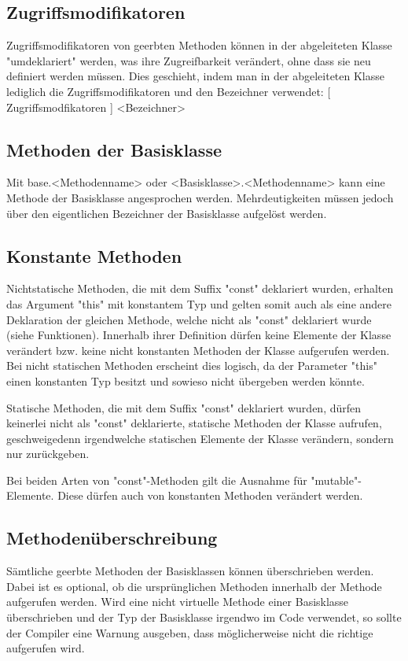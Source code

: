 \subsection{Zugriffsmodifikatoren}
Zugriffsmodifikatoren von geerbten Methoden können in der abgeleiteten Klasse "umdeklariert" werden, was ihre Zugreifbarkeit verändert,
ohne dass sie neu definiert werden müssen.
Dies geschieht, indem man in der abgeleiteten Klasse lediglich die Zugriffsmodifikatoren und den Bezeichner verwendet:
[ Zugriffsmodfikatoren ] <Bezeichner>

\subsection{Methoden der Basisklasse}
Mit base.<Methodenname> oder <Basisklasse>.<Methodenname> kann eine Methode der Basisklasse angesprochen werden.
Mehrdeutigkeiten müssen jedoch über den eigentlichen Bezeichner der Basisklasse aufgelöst werden.

\subsection{Konstante Methoden}
Nichtstatische Methoden, die mit dem Suffix "const" deklariert wurden, erhalten das Argument "this" mit konstantem Typ
und gelten somit auch als eine andere Deklaration der gleichen Methode, welche nicht als "const"
deklariert wurde (siehe Funktionen).
Innerhalb ihrer Definition dürfen keine Elemente der Klasse verändert bzw. keine nicht konstanten Methoden der Klasse
aufgerufen werden. Bei nicht statischen Methoden erscheint dies logisch, da der Parameter "this" einen konstanten Typ besitzt
und sowieso nicht übergeben werden könnte.

Statische Methoden, die mit dem Suffix "const" deklariert wurden, dürfen keinerlei nicht als "const" deklarierte, statische
Methoden der Klasse aufrufen, geschweigedenn irgendwelche statischen Elemente der Klasse verändern, sondern nur zurückgeben.

Bei beiden Arten von "const"-Methoden gilt die Ausnahme für "mutable"-Elemente.
Diese dürfen auch von konstanten Methoden verändert werden.

\subsection{Methodenüberschreibung}
Sämtliche geerbte Methoden der Basisklassen können überschrieben werden. Dabei ist es optional, ob die ursprünglichen Methoden innerhalb
der Methode aufgerufen werden.
Wird eine nicht virtuelle Methode einer Basisklasse überschrieben und der Typ der Basisklasse irgendwo im Code verwendet, so sollte
der Compiler eine Warnung ausgeben, dass möglicherweise nicht die richtige aufgerufen wird.

